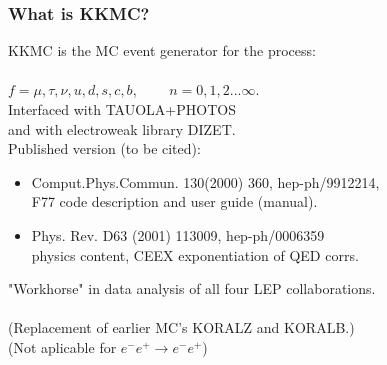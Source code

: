 \documentclass{beamer}
\newcommand{\cbl}{\color{blue}}
\newcommand{\cmg}{\color{magenta}}
\begin{document}
\begin{frame}[fragile]
\frametitle{\bf What is KKMC?}
{\large
KKMC is the MC event generator for the process:\\
~~~~~~~~~~~~~~\fbox{\cbl $e^-e^+ \to f\bar{f}+ n\gamma$}\\
{\cbl $f=\mu,\tau,\nu,u,d,s,c,b$,~~~~ $n=0,1,2...\infty$.}
}\\
Interfaced with TAUOLA+PHOTOS\\
and with electroweak library DIZET.\\

Published version \fbox{\cmg 4.13} (to be cited):
\begin{itemize}
\item
Comput.Phys.Commun. 130(2000) 360, hep-ph/9912214,\\
F77 code description and user guide (manual).
\item
Phys. Rev. D63 (2001) 113009, hep-ph/0006359\\
physics content, CEEX exponentiation of QED corrs.\\
\end{itemize}
"Workhorse" in data analysis of all four LEP collaborations.\\
~~~\\
\footnotesize
(Replacement of earlier MC's KORALZ and KORALB.)\\
(Not aplicable for  $e^-e^+ \to e^-e^+$)

\end{frame}
\end{document}
